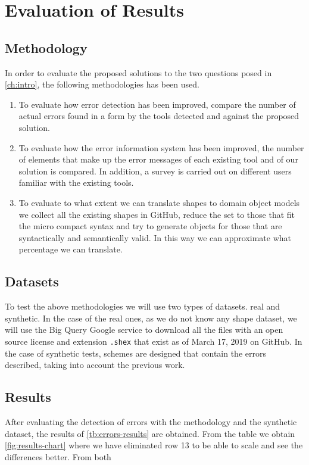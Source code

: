 \chapter{Evaluation of Results}
\label{ch:results-evaluation}

\section{Methodology}
In order to evaluate the proposed solutions to the two questions posed in \cref{ch:intro},
the following methodologies has been used.

\begin{enumerate}
    \item To evaluate how error detection has been improved, compare the number of actual errors found
    in a form by the tools detected and against the proposed solution.
    
    \item To evaluate how the error information system has been improved, the number of elements that
    make up the error messages of each existing tool and of our solution is compared. In addition,
    a survey is carried out on different users familiar with the existing tools.

    \item To evaluate to what extent we can translate shapes to domain object models we collect all the
    existing shapes in GitHub, reduce the set to those that fit the micro compact syntax and try to
    generate objects for those that are syntactically and semantically valid. In this way we can
    approximate what percentage we can translate.
\end{enumerate}

\section{Datasets}
To test the above methodologies we will use two types of datasets.
real and synthetic. In the case of the real ones, as we do not know
any shape dataset, we will use the Big Query Google service to download
all the files with an open source license and extension \texttt{.shex}
that exist as of March 17, 2019 on GitHub. In the case of synthetic tests,
schemes are designed that contain the errors described, taking into account
the previous work.

\section{Results}
After evaluating the detection of errors with the methodology and the synthetic dataset,
the results of \cref{tb:errors-results} are obtained. From the table we obtain \cref{fig:results-chart}
where we have eliminated row 13 to be able to scale and see the differences better. From both

